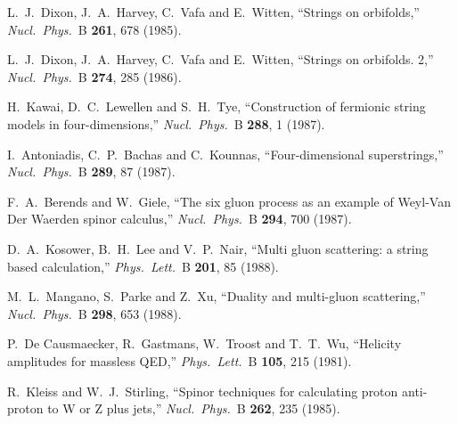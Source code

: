 \begin{thebibliography}{99}
L.~J.~Dixon, J.~A.~Harvey, C.~Vafa and E.~Witten,
``Strings on orbifolds,''
{\it Nucl.\ Phys.}\ B {\bf 261}, 678 (1985).

L.~J.~Dixon, J.~A.~Harvey, C.~Vafa and E.~Witten,
``Strings on orbifolds. 2,''
{\it Nucl.\ Phys.}\ B {\bf 274}, 285 (1986).

H.~Kawai, D.~C.~Lewellen and S.~H.~Tye,
``Construction of fermionic string models in four-dimensions,''
{\it Nucl.\ Phys.}\ B {\bf 288}, 1 (1987).

I.~Antoniadis, C.~P.~Bachas and C.~Kounnas,
``Four-dimensional superstrings,''
{\it Nucl.\ Phys.}\ B {\bf 289}, 87 (1987).

F.~A.~Berends and W.~Giele,
``The six gluon process as an example of Weyl-Van Der Waerden 
spinor calculus,''
{\it Nucl.\ Phys.}\ B {\bf 294}, 700 (1987).

D.~A.~Kosower, B.~H.~Lee and V.~P.~Nair,
``Multi gluon scattering: a string based calculation,''
{\it Phys.\ Lett.}\ B {\bf 201}, 85 (1988).

M.~L.~Mangano, S.~Parke and Z.~Xu,
``Duality and multi-gluon scattering,''
{\it Nucl.\ Phys.}\ B {\bf 298}, 653 (1988).

P.~De Causmaecker, R.~Gastmans, W.~Troost and T.~T.~Wu,
``Helicity amplitudes for massless QED,''
{\it Phys.\ Lett.}\ B {\bf 105}, 215 (1981).

R.~Kleiss and W.~J.~Stirling,
``Spinor techniques for calculating proton anti-proton to W or Z plus
jets,''
{\it Nucl.\ Phys.}\ B {\bf 262}, 235 (1985).


\end{thebibliography}
